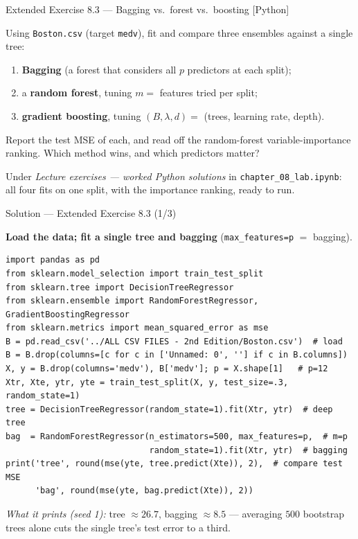 \documentclass[aspectratio=169,11pt]{beamer}
\begin{document}
\begin{frame}{Extended Exercise 8.3 --- Bagging vs.\ forest vs.\ boosting [Python]}
\begin{longexercise}
Using \texttt{Boston.csv} (target \texttt{medv}), fit and compare three ensembles against a single tree:
\begin{enumerate}
  \item \textbf{Bagging} (a forest that considers all $p$ predictors at each split);
  \item a \textbf{random forest}, tuning $m=$ features tried per split;
  \item \textbf{gradient boosting}, tuning $(B,\lambda,d)=$ (trees, learning rate, depth).
\end{enumerate}
Report the test MSE of each, and read off the random-forest variable-importance ranking. Which method wins, and which predictors matter?
\end{longexercise}
\begin{labnote}
Under \emph{Lecture exercises --- worked Python solutions} in \texttt{chapter\_08\_lab.ipynb}: all four fits on one split, with the importance ranking, ready to run.
\end{labnote}
\end{frame}

\begin{frame}[fragile]{Solution --- Extended Exercise 8.3 (1/3)}
\begin{solutionbox}
\textbf{Load the data; fit a single tree and bagging} (\texttt{max\_features=p} $=$ bagging).
\begin{lstlisting}[basicstyle=\ttfamily\scriptsize]
import pandas as pd
from sklearn.model_selection import train_test_split
from sklearn.tree import DecisionTreeRegressor
from sklearn.ensemble import RandomForestRegressor, GradientBoostingRegressor
from sklearn.metrics import mean_squared_error as mse
B = pd.read_csv('../ALL CSV FILES - 2nd Edition/Boston.csv')  # load
B = B.drop(columns=[c for c in ['Unnamed: 0', ''] if c in B.columns])
X, y = B.drop(columns='medv'), B['medv']; p = X.shape[1]   # p=12
Xtr, Xte, ytr, yte = train_test_split(X, y, test_size=.3, random_state=1)
tree = DecisionTreeRegressor(random_state=1).fit(Xtr, ytr)  # deep tree
bag  = RandomForestRegressor(n_estimators=500, max_features=p,  # m=p
                             random_state=1).fit(Xtr, ytr)  # bagging
print('tree', round(mse(yte, tree.predict(Xte)), 2),  # compare test MSE
      'bag', round(mse(yte, bag.predict(Xte)), 2))
\end{lstlisting}
\emph{What it prints (seed 1):} tree $\approx26.7$, bagging $\approx8.5$ --- averaging $500$ bootstrap trees alone cuts the single tree's test error to a third.
\end{solutionbox}
\end{frame}
\end{document}
